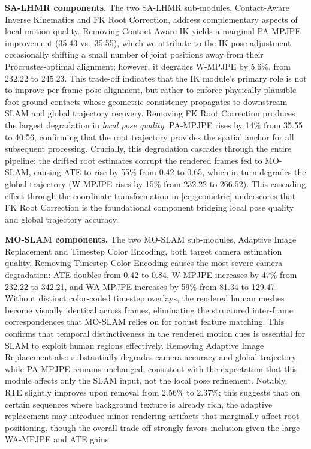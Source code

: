 \noindent\textbf{SA-LHMR components.}
The two SA-LHMR sub-modules, Contact-Aware Inverse Kinematics and FK Root Correction, address complementary aspects of local motion quality. Removing Contact-Aware IK yields a marginal PA-MPJPE improvement (35.43 vs.\ 35.55), which we attribute to the IK pose adjustment occasionally shifting a small number of joint positions away from their Procrustes-optimal alignment; however, it degrades W-MPJPE by 5.6\%, from 232.22 to 245.23. This trade-off indicates that the IK module's primary role is not to improve per-frame pose alignment, but rather to enforce physically plausible foot-ground contacts whose geometric consistency propagates to downstream SLAM and global trajectory recovery. Removing FK Root Correction produces the largest degradation in \emph{local pose quality}: PA-MPJPE rises by 14\% from 35.55 to 40.56, confirming that the root trajectory provides the spatial anchor for all subsequent processing. Crucially, this degradation cascades through the entire pipeline: the drifted root estimates corrupt the rendered frames fed to MO-SLAM, causing ATE to rise by 55\% from 0.42 to 0.65, which in turn degrades the global trajectory (W-MPJPE rises by 15\% from 232.22 to 266.52). This cascading effect through the coordinate transformation in \cref{eq:geometric} underscores that FK Root Correction is the foundational component bridging local pose quality and global trajectory accuracy.

\noindent\textbf{MO-SLAM components.}
The two MO-SLAM sub-modules, Adaptive Image Replacement and Timestep Color Encoding, both target camera estimation quality. Removing Timestep Color Encoding causes the most severe camera degradation: ATE doubles from 0.42 to 0.84, W-MPJPE increases by 47\% from 232.22 to 342.21, and WA-MPJPE increases by 59\% from 81.34 to 129.47. Without distinct color-coded timestep overlays, the rendered human meshes become visually identical across frames, eliminating the structured inter-frame correspondences that MO-SLAM relies on for robust feature matching. This confirms that temporal distinctiveness in the rendered motion cues is essential for SLAM to exploit human regions effectively. Removing Adaptive Image Replacement also substantially degrades camera accuracy and global trajectory, while PA-MPJPE remains unchanged, consistent with the expectation that this module affects only the SLAM input, not the local pose refinement. Notably, RTE slightly improves upon removal from 2.56\% to 2.37\%; this suggests that on certain sequences where background texture is already rich, the adaptive replacement may introduce minor rendering artifacts that marginally affect root positioning, though the overall trade-off strongly favors inclusion given the large WA-MPJPE and ATE gains.

